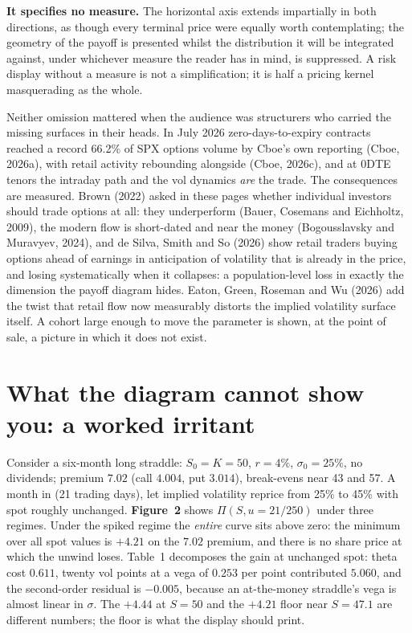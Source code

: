 \documentclass[11pt,a4paper]{article}
\begin{document}
\textbf{It specifies no measure.} The horizontal axis extends impartially in both directions, as though every terminal price were equally worth contemplating; the geometry of the payoff is presented whilst the distribution it will be integrated against, under whichever measure the reader has in mind, is suppressed. A risk display without a measure is not a simplification; it is half a pricing kernel masquerading as the whole.

Neither omission mattered when the audience was structurers who carried the missing surfaces in their heads. In July 2026 zero-days-to-expiry contracts reached a record 66.2\% of SPX options volume by Cboe's own reporting (Cboe, 2026a), with retail activity rebounding alongside (Cboe, 2026c), and at 0DTE tenors the intraday path and the vol dynamics \emph{are} the trade. The consequences are measured. Brown (2022) asked in these pages whether individual investors should trade options at all: they underperform (Bauer, Cosemans and Eichholtz, 2009), the modern flow is short-dated and near the money (Bogousslavsky and Muravyev, 2024), and de Silva, Smith and So (2026) show retail traders buying options ahead of earnings in anticipation of volatility that is already in the price, and losing systematically when it collapses: a population-level loss in exactly the dimension the payoff diagram hides. Eaton, Green, Roseman and Wu (2026) add the twist that retail flow now measurably distorts the implied volatility surface itself. A cohort large enough to move the parameter is shown, at the point of sale, a picture in which it does not exist.

\section{What the diagram cannot show you: a worked irritant}

\noindent Consider a six-month long straddle: $S_0 = K = 50$, $r = 4\%$, $\sigma_0 = 25\%$, no dividends; premium $7.02$ (call $4.004$, put $3.014$), break-evens near 43 and 57. A month in (21 trading days), let implied volatility reprice from 25\% to 45\% with spot roughly unchanged. \textbf{Figure~2} shows $\Pi(S, u = 21/250)$ under three regimes. Under the spiked regime the \emph{entire} curve sits above zero: the minimum over all spot values is $+4.21$ on the $7.02$ premium, and there is no share price at which the unwind loses. Table~1 decomposes the gain at unchanged spot: theta cost $0.611$, twenty vol points at a vega of $0.253$ per point contributed $5.060$, and the second-order residual is $-0.005$, because an at-the-money straddle's vega is almost linear in $\sigma$. The $+4.44$ at $S = 50$ and the $+4.21$ floor near $S = 47.1$ are different numbers; the floor is what the display should print.
\end{document}
